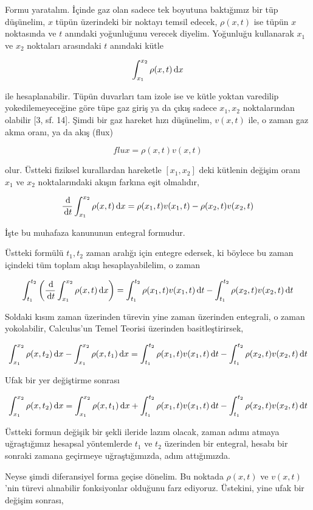\documentclass[12pt,fleqn]{article}\usepackage{../../common}
\begin{document}
Formu yaratalım. İçinde gaz olan sadece tek boyutuna baktığımız bir tüp
düşünelim, $x$ tüpün üzerindeki bir noktayı temsil edecek, $\rho(x,t)$ ise tüpün
$x$ noktasında ve $t$ anındaki yoğunluğunu verecek diyelim. Yoğunluğu kullanarak
$x_1$ ve $x_2$ noktaları arasındaki $t$ anındaki kütle

$$
\int _{x_1}^{x_2} \rho(x,t) \,\mathrm{d} x
$$

ile hesaplanabilir. Tüpün duvarları tam izole ise ve kütle yoktan varedilip
yokedilemeyeceğine göre tüpe gaz giriş ya da çıkış sadece $x_1,x_2$
noktalarından olabilir [3, sf. 14]. Şimdi bir gaz hareket hızı düşünelim,
$v(x,t)$ ile, o zaman gaz akma oranı, ya da akış (flux)

$$
flux = \rho(x,t) v(x,t)
$$

olur. Üstteki fiziksel kurallardan hareketle $[x_1,x_2]$ deki kütlenin
değişim oranı $x_1$ ve $x_2$ noktalarındaki akışın farkına eşit olmalıdır,

$$
\frac{\,\mathrm{d}}{\,\mathrm{d} t} \int _{x_1}^{x_2} \rho(x,t) \,\mathrm{d} x =
\rho(x_1,t) v(x_1,t) - \rho(x_2,t) v(x_2,t)
$$

İşte bu muhafaza kanununun entegral formudur. 

Üstteki formülü $t_1,t_2$ zaman aralığı için entegre edersek, ki böylece
bu zaman içindeki tüm toplam akışı hesaplayabilelim, o zaman

$$
\int_{t_1}^{t_2} \left( \frac{\,\mathrm{d}}{\,\mathrm{d} t} \int _{x_1}^{x_2} \rho(x,t) \,\mathrm{d} x  \right)  =
\int_{t_1}^{t_2} \rho(x_1,t) v(x_1,t) \,\mathrm{d} t -
\int_{t_1}^{t_2} \rho(x_2,t) v(x_2,t) \,\mathrm{d} t
$$

Soldaki kısım zaman üzerinden türevin yine zaman üzerinden entegrali, o zaman
yokolabilir, Calculus'un Temel Teorisi üzerinden basitleştirirsek,

$$
\int _{x_1}^{x_2} \rho(x,t_2) \,\mathrm{d} x -
\int _{x_1}^{x_2} \rho(x,t_1) \,\mathrm{d} x  = 
\int_{t_1}^{t_2} \rho(x_1,t) v(x_1,t) \,\mathrm{d} t -
\int_{t_1}^{t_2}  \rho(x_2,t) v(x_2,t) \,\mathrm{d} t
$$

Ufak bir yer değiştirme sonrası

$$
\int _{x_1}^{x_2} \rho(x,t_2) \,\mathrm{d} x =
\int _{x_1}^{x_2} \rho(x,t_1) \,\mathrm{d} x  +
\int_{t_1}^{t_2} \rho(x_1,t) v(x_1,t) \,\mathrm{d} t -
\int_{t_1}^{t_2}  \rho(x_2,t) v(x_2,t) \,\mathrm{d} t
$$

Üstteki formun değişik bir şekli ileride lazım olacak, zaman adımı atmaya
uğraştığımız hesapsal yöntemlerde $t_1$ ve $t_2$ üzerinden bir entegral, hesabı
bir sonraki zamana geçirmeye uğraştığımızda, adım attığımızda.

Neyse şimdi diferansiyel forma geçise dönelim. Bu noktada $\rho(x,t)$ ve
$v(x,t)$'nin türevi alınabilir fonksiyonlar olduğunu farz ediyoruz. Üstekini,
yine ufak bir değişim sonrası,
\end{document}
